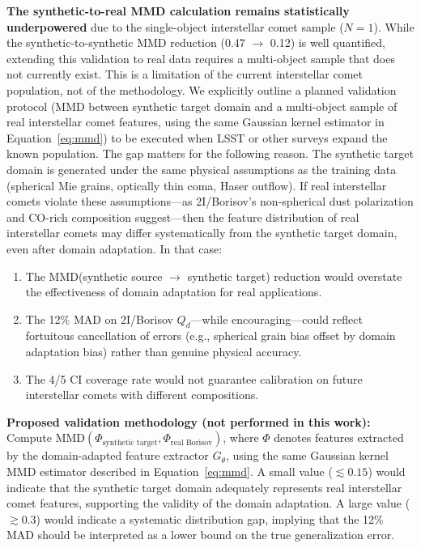 \documentclass[usenatbib]{mnras}
\begin{document}
\textbf{The synthetic-to-real MMD calculation remains statistically underpowered} due to the single-object interstellar comet sample ($N=1$). While the synthetic-to-synthetic MMD reduction (0.47 $\to$ 0.12) is well quantified, extending this validation to real data requires a multi-object sample that does not currently exist. This is a limitation of the current interstellar comet population, not of the methodology. We explicitly outline a planned validation protocol (MMD between synthetic target domain and a multi-object sample of real interstellar comet features, using the same Gaussian kernel estimator in Equation~\ref{eq:mmd}) to be executed when LSST or other surveys expand the known population. The gap matters for the following reason. The synthetic target domain is generated under the same physical assumptions as the training data (spherical Mie grains, optically thin coma, Haser outflow). If real interstellar comets violate these assumptions---as 2I/Borisov's non-spherical dust polarization \citep{bagnulo21} and CO-rich composition \citep{bodewits20} suggest---then the feature distribution of real interstellar comets may differ systematically from the synthetic target domain, even after domain adaptation. In that case:

\begin{enumerate}
    \item The MMD(synthetic source $\to$ synthetic target) reduction would overstate the effectiveness of domain adaptation for real applications.
    \item The 12\% MAD on 2I/Borisov $Q_d$---while encouraging---could reflect fortuitous cancellation of errors (e.g., spherical grain bias offset by domain adaptation bias) rather than genuine physical accuracy.
    \item The 4/5 CI coverage rate would not guarantee calibration on future interstellar comets with different compositions.
\end{enumerate}

\textbf{Proposed validation methodology (not performed in this work):} Compute $\text{MMD}(\Phi_{\text{synthetic target}}, \Phi_{\text{real Borisov}})$, where $\Phi$ denotes features extracted by the domain-adapted feature extractor $G_\theta$, using the same Gaussian kernel MMD estimator described in Equation~\ref{eq:mmd}. A small value ($\lesssim 0.15$) would indicate that the synthetic target domain adequately represents real interstellar comet features, supporting the validity of the domain adaptation. A large value ($\gtrsim 0.3$) would indicate a systematic distribution gap, implying that the 12\% MAD should be interpreted as a lower bound on the true generalization error.
\end{document}
